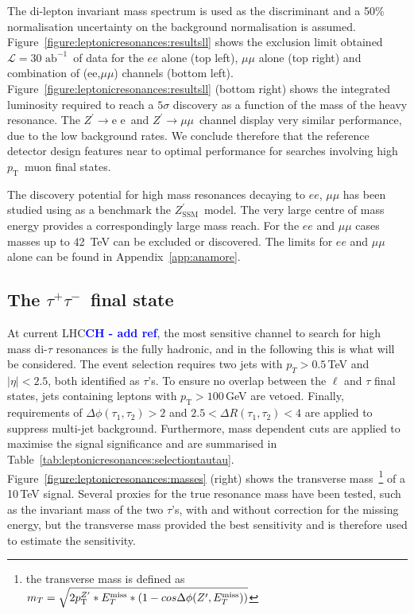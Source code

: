 \documentclass[a4paper,11pt]{article}
\newcommand{\CH}[1] {\textbf{\textcolor{blue}{CH - #1}}}
\newcommand{\Zp}{\ensuremath{Z^{\prime}}}
\newcommand{\ZpSSM}{\ensuremath{Z^{\prime}_{\mathrm{SSM}}}}
\newcommand*{\Zpee}{\ensuremath{Z^{\prime}\rightarrow \text{e e}}}
\newcommand*{\Zpmumu}{\ensuremath{Z^{\prime}\rightarrow \mu\mu}}
\newcommand{\pt}{\ensuremath{p_{\text{T}}}}
\newcommand{\ptZp}{\ensuremath{p_{\text{T}}^{\ensuremath{Z^{\prime}}}}}
\newcommand*{\met}{\ensuremath{E_{T}^{\rm{miss}}}}
\newcommand*{\intlumifcc}{\ensuremath{\mathcal{L}=30\text{ ab}^{-1}}}
\newcommand*{\tautau}{\ensuremath{\tau^{+}\tau^{-}}}
\begin{document}
The di-lepton invariant mass spectrum is used as the discriminant and a 50\% normalisation uncertainty on the background normalisation is assumed.
Figure~\ref{figure:leptonicresonances:resultsll} shows the exclusion limit obtained \intlumifcc\ of data for the $ee$ alone (top left), $\mu\mu$ alone (top right) and combination of (ee,$\mu\mu$) channels (bottom left). Figure~\ref{figure:leptonicresonances:resultsll} (bottom right) shows the integrated luminosity required to reach a $5\sigma$ discovery as a function of the mass of the heavy resonance. The \Zpee\ and \Zpmumu\ channel display very similar performance, due to the low background rates. We conclude therefore that the reference detector design features near to optimal performance for searches involving high \pt\ muon final states.

The discovery potential for high mass resonances decaying to $ee$, $\mu\mu$ has been studied using as a benchmark the \ZpSSM\ model. The very large centre of mass energy provides a correspondingly large mass reach. For the $ee$ and $\mu\mu$ cases masses up to 42~TeV can be excluded or discovered.
The limits for $ee$ and $\mu\mu$ alone can be found in Appendix~\ref{app:anamore}.

\subsection{The \tautau\ final state}
\label{sec:leptautau}

At current LHC\CH{add ref}, the most sensitive channel to search for high mass di-$\tau$ resonances is the fully hadronic, and in the following this is what will be considered.
The event selection requires two jets with $p_{T} > 0.5$\,TeV and $|\eta|<2.5$, both identified as $\tau$'s. To ensure no overlap between the $\ell$ and $\tau$ final states, jets containing leptons with $\pt > 100$\,GeV are vetoed. Finally, requirements of $\Delta \phi(\tau_1, \tau_2)> 2$ and $2.5<\Delta R(\tau_1, \tau_2)<4$ are applied to suppress multi-jet background.
Furthermore, mass dependent cuts are applied to maximise the signal significance and are summarised in Table~\ref{tab:leptonicresonances:selectiontautau}. Figure~\ref{figure:leptonicresonances:masses} (right) shows the transverse mass~\footnote{the transverse mass is defined as $m_{T}  =  \sqrt{2\ptZp*\met*(1-cos\Delta\phi(\Zp,\met))} $}
of a 10\,TeV signal. Several proxies for the true resonance mass have been tested, such as the invariant mass of the two $\tau$'s, with and without correction for the missing energy, but the transverse mass provided the best sensitivity and is therefore used to estimate the sensitivity. 
\end{document}

